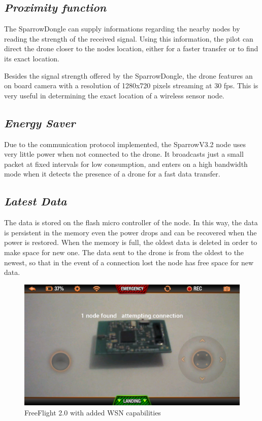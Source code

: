 \subsection{\textit{Proximity function}} 

\label{sec:prox}

The SparrowDongle can supply informations regarding the nearby nodes by reading the strength of the received signal. Using this information, the pilot can direct the drone closer to the nodes location, either for a faster transfer or to find its exact location. 

Besides the signal strength offered by the SparrowDongle, the drone features an on board camera with a resolution of 1280x720 pixels streaming at 30 fps. This is very useful in determining the exact location of a wireless sensor node.


\subsection{\textit{Energy Saver}} 

\label{sec:eng}

Due to the communication protocol implemented, the SparrowV3.2 node uses very little power when not connected to the drone. It broadcasts just a small packet at fixed intervals for low consumption, and enters on a high bandwidth mode when it detects the presence of a drone for a fast data transfer. 


\subsection{\textit{Latest Data}} 

\label{sec:data}

The data is stored on the flash micro controller of the node. In this way, the data is persistent in the memory even the power drops and can be recovered when the power is restored. When the memory is full, the oldest data is deleted in order to make space for new one. The data sent to the drone is from the oldest to the newest, so that in the event of a connection lost the node has free space for new data. 


\begin{figure}[ht] \centering
\includegraphics[width=1\textwidth]{img/app.png}
\caption{FreeFlight 2.0 with added WSN capabilities } \end{figure}
 



